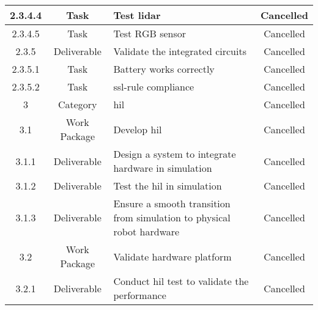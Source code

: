 \begin{longtable}{|c|c|m{}|c|}
    \rowcolor{c} 2.3.4.4 & Task & Test \acs{lidar} & Cancelled \\ \hline
    \rowcolor{c} 2.3.4.5 & Task & Test RGB sensor & Cancelled \\ \hline
    \rowcolor{c} 2.3.5 & Deliverable & Validate the integrated circuits & Cancelled \\ \hline
    \rowcolor{c} 2.3.5.1 & Task & Battery works correctly & Cancelled \\ \hline
    \rowcolor{c} 2.3.5.2 & Task & \acs{ssl}-rule compliance & Cancelled \\ \hline
    \rowcolor{c} 3 & Category & \acs{hil} & Cancelled \\ \hline
    \rowcolor{c} 3.1 & Work Package & Develop \acs{hil} & Cancelled \\ \hline
    \rowcolor{c} 3.1.1 & Deliverable & Design a system to integrate hardware in simulation & Cancelled \\ \hline
    \rowcolor{c} 3.1.2 & Deliverable & Test the \acs{hil} in simulation & Cancelled \\ \hline
    \rowcolor{c} 3.1.3 & Deliverable & Ensure a smooth transition from simulation to physical robot hardware & Cancelled \\ \hline
    \rowcolor{c} 3.2 & Work Package & Validate hardware platform & Cancelled \\ \hline
    \rowcolor{c} 3.2.1 & Deliverable & Conduct \acs{hil} test to validate the performance & Cancelled \\ \hline
\end{longtable}
\twocolumn

